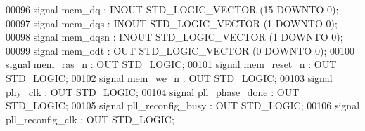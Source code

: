 \begin{DoxyCode}
00096                  \textcolor{keywordflow}{signal} \textcolor{vhdlchar}{mem_dq} \textcolor{vhdlchar}{:} \textcolor{keywordflow}{INOUT} \textcolor{comment}{STD\_LOGIC\_VECTOR} \textcolor{vhdlchar}{(}\textcolor{vhdllogic}{}\textcolor{vhdllogic}{15} \textcolor{keywordflow}{DOWNTO} \textcolor{vhdllogic}{}\textcolor{vhdllogic}{0}\textcolor{vhdlchar}{)};
00097                  \textcolor{keywordflow}{signal} \textcolor{vhdlchar}{mem_dqs} \textcolor{vhdlchar}{:} \textcolor{keywordflow}{INOUT} \textcolor{comment}{STD\_LOGIC\_VECTOR} \textcolor{vhdlchar}{(}\textcolor{vhdllogic}{}\textcolor{vhdllogic}{1} \textcolor{keywordflow}{DOWNTO} \textcolor{vhdllogic}{}\textcolor{vhdllogic}{0}\textcolor{vhdlchar}{)};
00098                  \textcolor{keywordflow}{signal} \textcolor{vhdlchar}{mem_dqsn} \textcolor{vhdlchar}{:} \textcolor{keywordflow}{INOUT} \textcolor{comment}{STD\_LOGIC\_VECTOR} \textcolor{vhdlchar}{(}\textcolor{vhdllogic}{}\textcolor{vhdllogic}{1} \textcolor{keywordflow}{DOWNTO} \textcolor{vhdllogic}{}\textcolor{vhdllogic}{0}\textcolor{vhdlchar}{)};
00099                  \textcolor{keywordflow}{signal} \textcolor{vhdlchar}{mem_odt} \textcolor{vhdlchar}{:} \textcolor{keywordflow}{OUT} \textcolor{comment}{STD\_LOGIC\_VECTOR} \textcolor{vhdlchar}{(}\textcolor{vhdllogic}{}\textcolor{vhdllogic}{0} \textcolor{keywordflow}{DOWNTO} \textcolor{vhdllogic}{}\textcolor{vhdllogic}{0}\textcolor{vhdlchar}{)};
00100                  \textcolor{keywordflow}{signal} \textcolor{vhdlchar}{mem_ras_n} \textcolor{vhdlchar}{:} \textcolor{keywordflow}{OUT} \textcolor{comment}{STD\_LOGIC};
00101                  \textcolor{keywordflow}{signal} \textcolor{vhdlchar}{mem_reset_n} \textcolor{vhdlchar}{:} \textcolor{keywordflow}{OUT} \textcolor{comment}{STD\_LOGIC};
00102                  \textcolor{keywordflow}{signal} \textcolor{vhdlchar}{mem_we_n} \textcolor{vhdlchar}{:} \textcolor{keywordflow}{OUT} \textcolor{comment}{STD\_LOGIC};
00103                  \textcolor{keywordflow}{signal} \textcolor{vhdlchar}{phy_clk} \textcolor{vhdlchar}{:} \textcolor{keywordflow}{OUT} \textcolor{comment}{STD\_LOGIC};
00104                  \textcolor{keywordflow}{signal} \textcolor{vhdlchar}{pll_phase_done} \textcolor{vhdlchar}{:} \textcolor{keywordflow}{OUT} \textcolor{comment}{STD\_LOGIC};
00105                  \textcolor{keywordflow}{signal} \textcolor{vhdlchar}{pll_reconfig_busy} \textcolor{vhdlchar}{:} \textcolor{keywordflow}{OUT} \textcolor{comment}{STD\_LOGIC};
00106                  \textcolor{keywordflow}{signal} \textcolor{vhdlchar}{pll_reconfig_clk} \textcolor{vhdlchar}{:} \textcolor{keywordflow}{OUT} \textcolor{comment}{STD\_LOGIC};

\end{DoxyCode}
